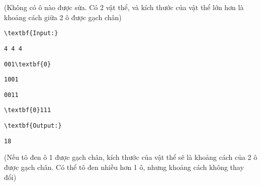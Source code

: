 (Không có ô nào được sửa. Có 2 vật thể, và kích thước của vật thể lớn hơn là khoảng cách giữa 2 ô được gạch chân)
\begin{verbatim}
\textbf{Input:}\end{verbatim}
\begin{verbatim}
4 4 4\end{verbatim}
\begin{verbatim}
001\textbf{0}\end{verbatim}
\begin{verbatim}
1001\end{verbatim}
\begin{verbatim}
0011\end{verbatim}
\begin{verbatim}
\textbf{0}111\end{verbatim}
\begin{verbatim}
\textbf{Output:}\end{verbatim}
\begin{verbatim}
18\end{verbatim}

(Nếu tô đen ô 1 được gạch chân, kích thước của vật thể sẽ là khoảng cách của 2 ô được gạch chân. Có thể tô đen nhiều hơn 1 ô, nhưng khoảng cách không thay đổi)